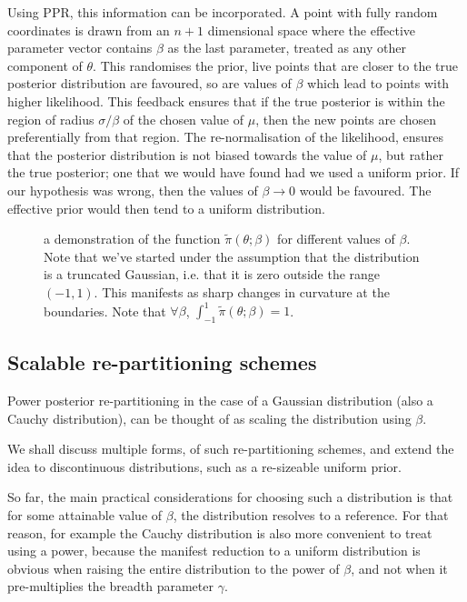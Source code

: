 \documentclass[usenatbib]{mnras}
\begin{document}
Using PPR, this information can be incorporated. A point with fully
random coordinates is drawn from an \(n+1\) dimensional space where
the effective parameter vector contains \(\beta\) as the last
parameter, treated as any other component of \(\theta\). This
randomises the prior, live points that are closer to the true
posterior distribution are favoured, so are values of \(\beta\)
which lead to points with higher likelihood.  This feedback ensures
that if the true posterior is within the region of radius \(\sigma
   / \beta\) of the chosen value of \(\mu\), then the new points are
chosen preferentially from that region. The re-normalisation of the
likelihood, ensures that the posterior distribution is not biased
towards the value of \(\mu\), but rather the true posterior; one
that we would have found had we used a uniform prior. If our
hypothesis was wrong, then the values of \(\beta \rightarrow 0\)
would be favoured. The effective prior would then tend to a uniform
distribution.

\begin{figure}
 
\caption{\label{org781f913}
a demonstration of the function \(\tilde{\pi}(\theta; \beta)\) for different values of \(\beta\). Note that we've started under the assumption that the distribution is a truncated Gaussian, i.e. that it is zero outside the range \((-1, 1)\). This manifests as sharp changes in curvature at the boundaries. Note that \(\forall \beta\), \(\int_{-1}^{1}\tilde{\pi}(\theta; \beta) = 1\).}
\end{figure}



\subsection{Scalable re-partitioning schemes}
\label{sec:org925b96b}

Power posterior re-partitioning in the case of a Gaussian
distribution (also a Cauchy distribution), can be thought of as
scaling the distribution using \(\beta\).

We shall discuss multiple forms, of such re-partitioning schemes,
and extend the idea to discontinuous distributions, such as a
re-sizeable uniform prior.  

So far, the main practical considerations for choosing such a
distribution is that for some attainable value of \(\beta\), the
distribution resolves to a reference. For that reason, for example
the Cauchy distribution is also more convenient to treat using a
power, because the manifest reduction to a uniform distribution is
obvious when raising the entire distribution to the power of
\(\beta\), and not when it pre-multiplies the breadth parameter
\(\gamma\).
\end{document}

